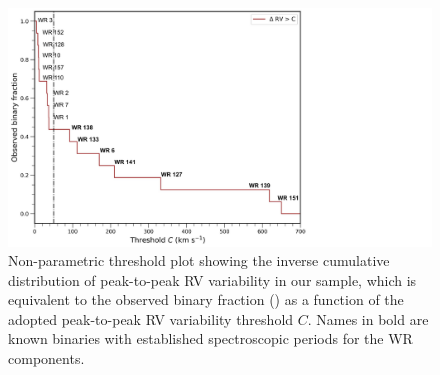 \begin{figure}[t]
    \centering
    \includegraphics[width=\textwidth]{chapters/WNE/image/BINFRAC_WN_NOGRID.pdf}
    \caption{Non-parametric threshold plot showing the inverse cumulative distribution of peak-to-peak RV variability in our sample, which is equivalent to the observed binary fraction (\fobsWNE{}) as a function of the adopted peak-to-peak RV variability threshold $C$. Names in bold are known binaries with established spectroscopic periods for the WR components.}
    \label{fig:binfrac}
\end{figure}
